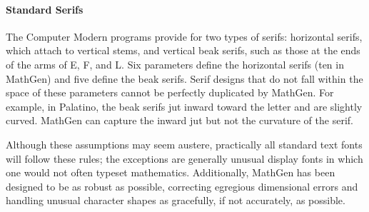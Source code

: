 \paragraph{Standard Serifs} The Computer Modern programs provide for two types
of serifs: horizontal serifs, which attach to vertical stems, and vertical beak
serifs, such as those at the ends of the arms of E, F, and L. Six parameters
define the horizontal serifs (ten in MathGen) and five define the beak serifs.
Serif designs that do not fall within the space of these parameters cannot be
perfectly duplicated by MathGen. For example, in Palatino, the beak serifs jut
inward toward the letter and are slightly curved. MathGen can capture the inward
jut but not the curvature of the serif.

\linespace

Although these assumptions may seem austere, practically all standard text fonts
will follow these rules; the exceptions are generally unusual display fonts in
which one would not often typeset mathematics. Additionally, MathGen has been
designed to be as robust as possible, correcting egregious dimensional errors
and handling unusual character shapes as gracefully, if not accurately, as
possible.
